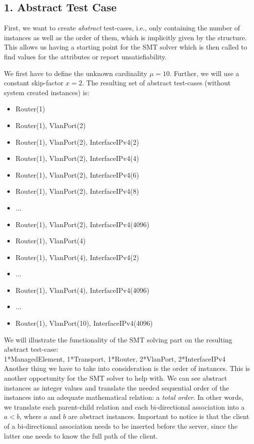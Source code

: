 \subsection*{1. Abstract Test Case}

First, we want to create \emph{abstract} test-cases, i.e., only containing the number of instances as well as the order of them, which is implicitly given by the structure. This allows us having a starting point for the SMT solver which is then called to find values for the attributes or report unsatisfiability.

We first have to define the unknown cardinality $\mu = 10$. Further, we will use a constant skip-factor $x = 2$. The resulting set of abstract test-cases (without system created instances) is:

\begin{itemize}
 \item \textsf{Router(1)}
 \item \textsf{Router(1), VlanPort(2)}
 \item \textsf{Router(1), VlanPort(2), InterfaceIPv4(2)}
 \item \textsf{Router(1), VlanPort(2), InterfaceIPv4(4)}
 \item \textsf{Router(1), VlanPort(2), InterfaceIPv4(6)}
 \item \textsf{Router(1), VlanPort(2), InterfaceIPv4(8)}
 \item ...
 \item \textsf{Router(1), VlanPort(2), InterfaceIPv4(4096)}
 \item \textsf{Router(1), VlanPort(4)}
 \item \textsf{Router(1), VlanPort(4), InterfaceIPv4(2)}
 \item ...
 \item \textsf{Router(1), VlanPort(4), InterfaceIPv4(4096)}
 \item ...
 \item \textsf{Router(1), VlanPort(10), InterfaceIPv4(4096)}
\end{itemize}

We will illustrate the functionality of the SMT solving part on the resulting abstract test-case:\\

\textsf{1*ManagedElement, 1*Transport, 1*Router, 2*VlanPort, 2*InterfaceIPv4}\\

Another thing we have to take into consideration is the order of instances. This is another opportunity for the SMT solver to help with. We can see abstract instances as integer values and translate the needed sequential order of the instances into an adequate mathematical relation: a \emph{total order}. In other words, we translate each parent-child relation and each bi-directional association into a $a < b$, where $a$ and $b$ are abstract instances. Important to notice is that the client of a bi-directional association needs to be inserted before the server, since the latter one needs to know the full path of the client. \\

